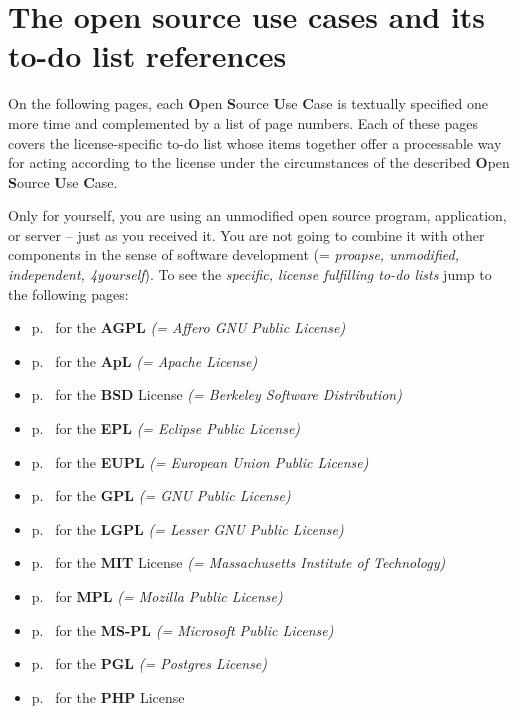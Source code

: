 \section{The open source use cases and its to-do list references}

On the following pages, each \textbf{O}pen \textbf{S}ource \textbf{U}se
\textbf{C}ase is textually specified one more time and complemented by a list of
page numbers. Each of these pages covers the license-specific to-do list whose
items together offer a processable way for acting according to the license under
the circumstances of the described \textbf{O}pen \textbf{S}ource \textbf{U}se
\textbf{C}ase.

\begin{description}
\label{OSUCList}
\item[OSUC-01:]\label{OSUC-01-DEF}
Only for yourself, you are using an unmodified open source program, application,
or server -- just as you received it. You are not going to combine it with other
components in the sense of software development (= \textit{proapse, unmodified,
independent, 4yourself}). 
To see the \textit{specific, license fulfilling to-do lists} jump to the
following pages:
  \begin{itemize}
    \item p.\ \pageref{OSUC-01-AGPL} for the \textbf{AGPL}
      \textit{(= Affero GNU Public License)} 
    \item p.\ \pageref{OSUC-01-Apache20} for the \textbf{ApL}
      \textit{(= Apache License)}
    \item p.\ \pageref{OSUC-01-BSD} for the \textbf{BSD} License
      \textit{(= Berkeley Software Distribution)}
    \item p.\ \pageref{OSUC-01-EPL} for the \textbf{EPL}
      \textit{(= Eclipse Public License)}     
    \item p.\ \pageref{OSUC-01-EUPL} for the \textbf{EUPL}
      \textit{(= European Union Public License)} 
    \item p.\ \pageref{OSUC-01-GPL} for the \textbf{GPL}
       \textit{(= GNU Public License)} 
    \item p.\ \pageref{OSUC-01-LGPL} for the \textbf{LGPL}
      \textit{(= Lesser GNU Public License)}           
    \item p.\ \pageref{OSUC-01-MIT} for the \textbf{MIT} License
       \textit{(= Massachusetts Institute of Technology)} 
    \item p.\ \pageref{OSUC-01-MPL} for \textbf{MPL}
      \textit{(= Mozilla Public License)}     
    \item p.\ \pageref{OSUC-01-MS-PL} for the \textbf{MS-PL}
      \textit{(= Microsoft Public License)} 
    \item p.\ \pageref{OSUC-01-PGL} for the \textbf{PGL}
      \textit{(= Postgres License)} 
    \item p.\ \pageref{OSUC-01-PHP} for the \textbf{PHP} License 
  \end{itemize}


\end{description}
